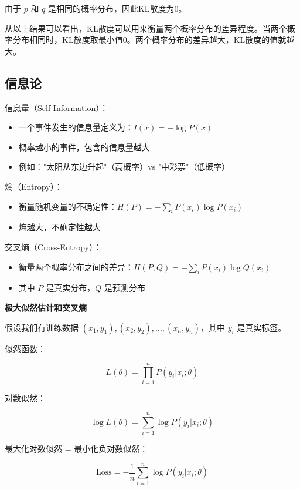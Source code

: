\documentclass[lang=cn,newtx,10pt,scheme=chinese]{elegantbook}
\begin{document}
由于 $p$ 和 $q$ 是相同的概率分布，因此KL散度为0。

从以上结果可以看出，KL散度可以用来衡量两个概率分布的差异程度。当两个概率分布相同时，KL散度取最小值0。两个概率分布的差异越大，KL散度的值就越大。

\subsection{信息论}

信息量（Self-Information）：

\begin{itemize}
\item 一个事件发生的信息量定义为：$I(x) = -\log P(x)$
\item 概率越小的事件，包含的信息量越大
\item 例如："太阳从东边升起"（高概率）vs "中彩票"（低概率）
\end{itemize}

熵（Entropy）：

\begin{itemize}
\item 衡量随机变量的不确定性：$H(P) = -\sum_{i} P(x_i) \log P(x_i)$
\item 熵越大，不确定性越大
\end{itemize}

交叉熵（Cross-Entropy）：

\begin{itemize}
\item 衡量两个概率分布之间的差异：$H(P, Q) = -\sum_{i} P(x_i) \log Q(x_i)$
\item 其中 $P$ 是真实分布，$Q$ 是预测分布
\end{itemize}

\textbf{极大似然估计和交叉熵}

假设我们有训练数据 ${(x_1, y_1), (x_2, y_2), ..., (x_n, y_n)}$，其中 $y_i$ 是真实标签。

似然函数：

\begin{equation}
L(\theta) = \prod_{i=1}^{n} P(y_i | x_i; \theta)
\end{equation}

对数似然：

\begin{equation}
\log L(\theta) = \sum_{i=1}^{n} \log P(y_i | x_i; \theta)
\end{equation}

最大化对数似然 = 最小化负对数似然：

\begin{equation}
\text{Loss} = -\frac{1}{n}\sum_{i=1}^{n} \log P(y_i | x_i; \theta)
\end{equation}
\end{document}
